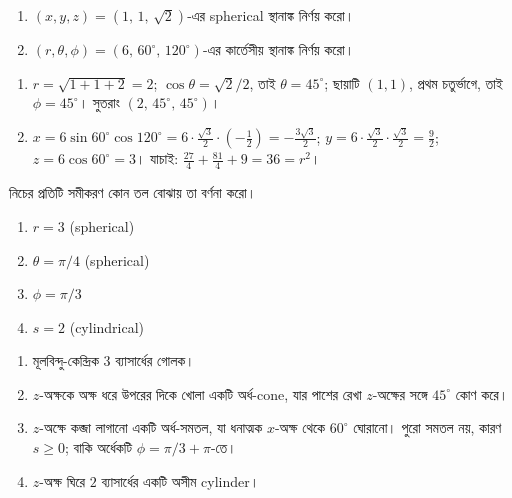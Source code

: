 \documentclass[11pt]{article}
\begin{document}
 \begin{enumerate}
  \item $(x,y,z) = \left( 1,\, 1,\, \sqrt{2} \right)$-এর spherical স্থানাঙ্ক
        নির্ণয় করো।
  \item $(r,\theta,\phi) = \left( 6,\, 60^{\circ},\, 120^{\circ} \right)$-এর
        কার্তেসীয় স্থানাঙ্ক নির্ণয় করো।
\end{enumerate}

\begin{sol}
\begin{enumerate}
  \item $r = \sqrt{1+1+2} = 2$;
        $\cos\theta = \sqrt{2}/2$, তাই $\theta = 45^{\circ}$;
        ছায়াটি $(1,1)$, প্রথম চতুর্ভাগে, তাই $\phi = 45^{\circ}$।
        সুতরাং $(2,\, 45^{\circ},\, 45^{\circ})$।
  \item $x = 6\sin 60^{\circ}\cos 120^{\circ}
           = 6 \cdot \tfrac{\sqrt{3}}{2} \cdot \left( -\tfrac{1}{2} \right)
           = -\tfrac{3\sqrt{3}}{2}$;
        $y = 6 \cdot \tfrac{\sqrt{3}}{2} \cdot \tfrac{\sqrt{3}}{2} = \tfrac{9}{2}$;
        $z = 6\cos 60^{\circ} = 3$।
        যাচাই: $\tfrac{27}{4} + \tfrac{81}{4} + 9 = 36 = r^{2}$।
\end{enumerate}
\end{sol}

 নিচের প্রতিটি সমীকরণ কোন তল বোঝায় তা বর্ণনা করো।
\begin{enumerate}
  \item $r = 3$ (spherical)
  \item $\theta = \pi/4$ (spherical)
  \item $\phi = \pi/3$
  \item $s = 2$ (cylindrical)
\end{enumerate}

\begin{sol}
\begin{enumerate}
  \item মূলবিন্দু-কেন্দ্রিক $3$ ব্যাসার্ধের গোলক।
  \item $z$-অক্ষকে অক্ষ ধরে উপরের দিকে খোলা একটি অর্ধ-cone, যার পাশের রেখা
        $z$-অক্ষের সঙ্গে $45^{\circ}$ কোণ করে।
  \item $z$-অক্ষে কব্জা লাগানো একটি অর্ধ-সমতল, যা ধনাত্মক $x$-অক্ষ থেকে
        $60^{\circ}$ ঘোরানো। পুরো সমতল নয়, কারণ $s \geq 0$; বাকি অর্ধেকটি
        $\phi = \pi/3 + \pi$-তে।
  \item $z$-অক্ষ ঘিরে $2$ ব্যাসার্ধের একটি অসীম cylinder।
\end{enumerate}
\end{sol}
\end{document}
